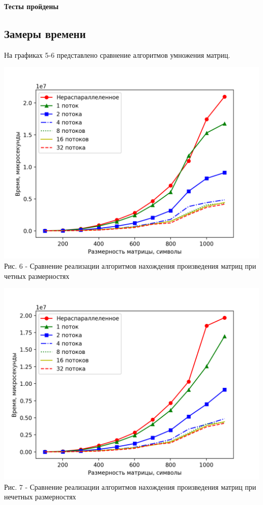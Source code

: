 \documentclass[a4paper,14pt]{article} %
\begin{document}
	
	\textbf{Тесты пройдены}

	\subsection{Замеры времени}
	\hfill
	
	На графиках 5-6 представлено сравнение алгоритмов умножения матриц. 
	\begin{center}
        		\includegraphics[scale = 1]{graph1} \\ Рис. 6 - Сравнение реализации алгоритмов нахождения произведения матриц при четных размерностях
	\end{center}
	
	\begin{center}
        		\includegraphics[scale = 1]{graph2} \\ Рис. 7 - Сравнение реализации алгоритмов нахождения произведения матриц при нечетных размерностях
	\end{center}
	
\end{document}
